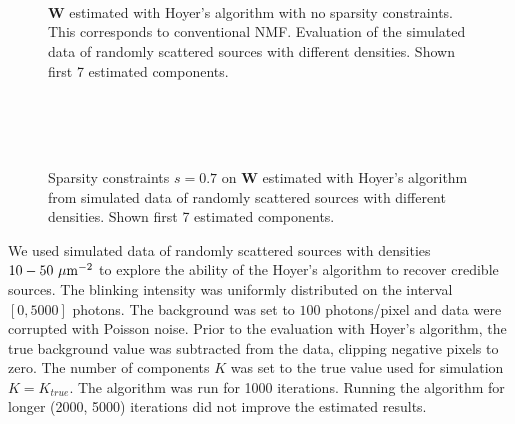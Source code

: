 \begin{figure}[!tbh] %
	\newcommand{\sizefig}{.9}
	\centering
	\\
	\\
	\\	
	\caption{$\bm{W}$ estimated with Hoyer's algorithm with no sparsity constraints. This corresponds to conventional NMF. Evaluation of the simulated data of randomly scattered sources with different densities. Shown first 7 estimated components.}
	\label{fig: Hoyer no sparsity constraint}
\end{figure}

\begin{figure}[htb!] %
	\newcommand{\sizefig}{.9}
	\centering
	\\
	\\
	\\	
	\caption{Sparsity constraints $s=0.7$ on $\bm{W}$ estimated with Hoyer's algorithm from simulated data of randomly scattered sources with different densities. Shown first 7 estimated components.}
	\label{fig: Hoyer sparsity 0.7}
\end{figure}

We used simulated data of randomly scattered sources with densities $10-50\,\, \mathrm{\mu m}^{-2}$ to explore the ability of the Hoyer's algorithm to recover credible sources. The blinking intensity was uniformly distributed on the interval $[0, 5000]$ photons. The background was set to $100$ photons/pixel and data were corrupted with Poisson noise. Prior to the evaluation with Hoyer's algorithm, the true background value was subtracted from the data, clipping negative pixels to zero. The number of components $K$ was set to the true value used for simulation $K=K_{true}$. The algorithm was run for 1000 iterations. Running the algorithm for longer (2000, 5000) iterations did not improve the estimated results. 

